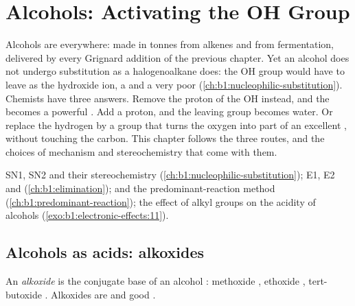 \chapter{Alcohols: Activating the OH Group}\label{ch:b1:alcohol-activation}

Alcohols are everywhere: made in tonnes from alkenes and from
fermentation, delivered by every Grignard addition of the previous
chapter. Yet an alcohol does not undergo substitution as a halogenoalkane
does: the OH group would have to leave as the hydroxide ion, a  and a very poor  (\cref{ch:b1:nucleophilic-substitution}).
Chemists have three answers. Remove the proton of the OH instead, and the
 becomes a powerful . Add a proton, and the leaving
group becomes water. Or replace the hydrogen by a group that turns the
oxygen into part of an excellent , without touching the
carbon. This chapter follows the three routes, and the choices of
mechanism and stereochemistry that come with them.

\begin{recall}
SN1, SN2 and their stereochemistry (\cref{ch:b1:nucleophilic-substitution});
E1, E2 and  (\cref{ch:b1:elimination}); 
and the predominant-reaction method (\cref{ch:b1:predominant-reaction});
the effect of alkyl groups on the acidity of alcohols
(\cref{exo:b1:electronic-effects:11}).
\end{recall}

\section{Alcohols as acids: alkoxides}

\begin{definition}[Alkoxide]\label{def:b1:alcohol-activation:alkoxide}
An \emph{alkoxide} is the conjugate base  of an
alcohol : methoxide , ethoxide ,
tert-butoxide . Alkoxides are  and good
.
\end{definition}

